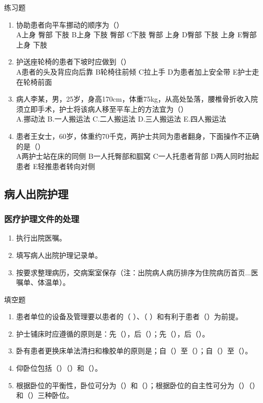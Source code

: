 \documentclass[11pt, a4paper]{ctexart}
\begin{document}
\begin{examplebox}{练习题}
	\begin{enumerate}
		\item 协助患者向平车挪动的顺序为（\qquad）\\
		      A上身 臀部 下肢 \quad B上身 下肢 臀部 \quad C下肢 臀部 上身 \quad D臀部 下肢 上身 \quad E臀部 上身 下肢
		\item 护送座轮椅的患者下坡时应做到（\qquad）\\
		      A患者的头及背应向后靠 \quad B轮椅往前倾 \quad C拉上手 \quad D为患者加上安全带 \quad E护士走在轮椅前面
		\item 病人李某，男，25岁，身高170cm，体重75kg，从高处坠落，腰椎骨折收入院须立即手术，护士将该病人移至平车上的方法宜为（\qquad）\\
		      A.挪动法 \quad B.一人搬运法 \quad C.二人搬运法 \quad D.三人搬运法 \quad E.四人搬运法
		\item 患者王女士，60岁，体重约70千克，两护士共同为患者翻身，下面操作不正确的是（\qquad）\\
		      A两护士站在床的同侧 \quad B一人托臀部和腘窝 \quad C一人托患者背部 \quad D两人同时抬起患者 \quad E轻推患者转向对侧
	\end{enumerate}
\end{examplebox}

\subsection{病人出院护理}
\subsubsection{医疗护理文件的处理}
\begin{enumerate}
	\item 执行出院医嘱。
	\item 填写病人出院护理记录单。
	\item 按要求整理病历，交病案室保存（注：出院病人病历排序为住院病历首页...医嘱单、体温单）。
\end{enumerate}

\begin{tipsbox}{填空题}
	\begin{enumerate}
		\item 患者单位的设备及管理要以患者的（   ）、（   ）和有利于患者（\qquad）为前提。
		\item 护士铺床时应遵循的原则是：先（\qquad），后（\qquad）；先（\qquad），后（\qquad）。
		\item 卧有患者更换床单法清扫和橡胶单的原则是；自（\qquad）至（\qquad）；自（\qquad）至（\qquad）。
		\item 仰卧位包括（\qquad）（\qquad）和（\qquad）。
		\item 根据卧位的平衡性，卧位可分为（\qquad）和（\qquad）；根据卧位的自主性可分为（\qquad）（\qquad）和（\qquad）三种卧位。
	\end{enumerate}
\end{tipsbox}
\end{document}
